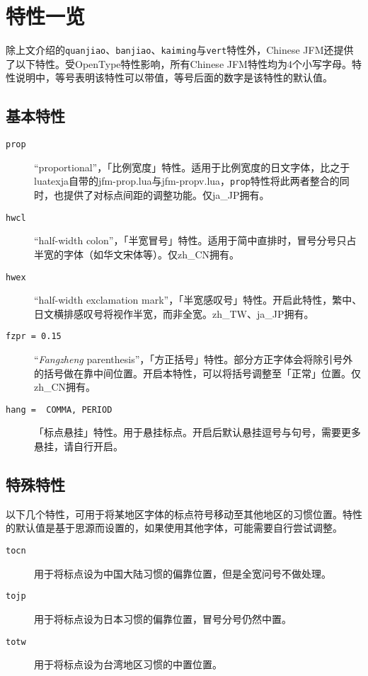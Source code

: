 \documentclass[a4paper , zihao=-4 , punct=zh_CN/kaiming]{ctexart}
\begin{document}
\section{特性一览}
除上文介绍的\+\verb|quanjiao|、\verb|banjiao|、\verb|kaiming|与\+\verb|vert|特性外，\textsf{Chinese JFM}还提供了以下特性。受OpenType特性影响，所有\textsf{Chinese JFM}特性均为4个小写字母。特性说明中，等号表明该特性可以带值，等号后面的数字是该特性的默认值。

\subsection{基本特性}
\begin{description}
  \item[\texttt{prop}] ``proportional''，「比例宽度」特性。适用于比例宽度的日文字体，比之于\textsf{lua\-texja}自带的\textsf{jfm-prop.lua}与\textsf{jfm-propv.lua}，\verb|prop|特性将此两者整合的同时，也提供了对标点间距的调整功能。仅\textsf{ja\_JP}拥有。
  \item[\texttt{hwcl}] ``half-width colon''，「半宽冒号」特性。适用于简中直排时，冒号分号只占半宽的字体（如华文宋体等）。仅\textsf{zh\_CN}拥有。
  \item[\texttt{hwex}] ``half-width exclamation mark''，「半宽感叹号」特性。开启此特性，繁中、日文横排感叹号将视作半宽，而非全宽。\textsf{zh\_TW}、\textsf{ja\_JP}拥有。
  \item[\texttt{fzpr = 0.15}] ``\textit{Fangzheng} parenthesis''，「方正括号」特性。部分方正字体会将除引号外的括号做在靠中间位置。开启本特性，可以将括号调整至「正常」位置。仅\textsf{zh\_CN}拥有。
  \item[\texttt{hang = { COMMA, PERIOD }}] 「标点悬挂」特性。用于悬挂标点。开启后默认悬挂逗号与句号，需要更多悬挂，请自行开启。
\end{description}

\subsection{特殊特性}
以下几个特性，可用于将某地区字体的标点符号移动至其他地区的习惯位置。特性的默认值是基于思源而设置的，如果使用其他字体，可能需要自行尝试调整。
\begin{description}
  \item[\texttt{tocn}] 用于将标点设为中国大陆习惯的偏靠位置，但是全宽问号不做处理。
  \item[\texttt{tojp}] 用于将标点设为日本习惯的偏靠位置，冒号分号仍然中置。
  \item[\texttt{totw}] 用于将标点设为台湾地区习惯的中置位置。
\end{description}
\end{document}

